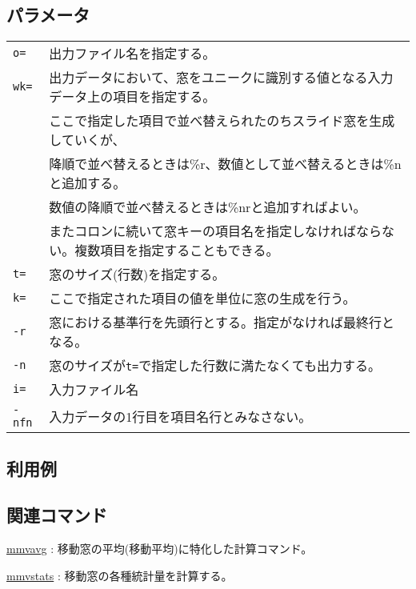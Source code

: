 \subsection*{パラメータ}
\begin{table}[htbp]
{\small
\begin{tabular}{ll}
\verb|o=|    & 出力ファイル名を指定する。\\
\verb|wk=|   & 出力データにおいて、窓をユニークに識別する値となる入力データ上の項目を指定する。\\
             & ここで指定した項目で並べ替えられたのちスライド窓を生成していくが、\\
			 & 降順で並べ替えるときは\%r、数値として並べ替えるときは\%nと追加する。\\
             & 数値の降順で並べ替えるときは\%nrと追加すればよい。\\
             & またコロンに続いて窓キーの項目名を指定しなければならない。複数項目を指定することもできる。 \\
\verb|t=|    & 窓のサイズ(行数)を指定する。 \\
\verb|k=|    & ここで指定された項目の値を単位に窓の生成を行う。\\
\verb|-r|    & 窓における基準行を先頭行とする。指定がなければ最終行となる。\\
\verb|-n|    & 窓のサイズが\verb|t=|で指定した行数に満たなくても出力する。\\
\verb|i=|    & 入力ファイル名\\
\verb|-nfn|  & 入力データの1行目を項目名行とみなさない。\\
\end{tabular} 
}
\end{table} 

\subsection*{利用例}

\subsection*{関連コマンド}
\hyperref[sect:mmvavg] {mmvavg} : 移動窓の平均(移動平均)に特化した計算コマンド。

\hyperref[sect:mmvstats] {mmvstats} : 移動窓の各種統計量を計算する。

%
